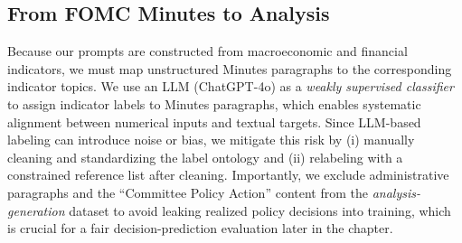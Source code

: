 








\subsection*{From FOMC Minutes to Analysis}

Because our prompts are constructed from macroeconomic and financial indicators, we must map unstructured Minutes paragraphs to the corresponding indicator topics. We use an LLM (ChatGPT-4o) as a \textit{weakly supervised classifier} to assign indicator labels to Minutes paragraphs, which enables systematic alignment between numerical inputs and textual targets. Since LLM-based labeling can introduce noise or bias, we mitigate this risk by (i) manually cleaning and standardizing the label ontology and (ii) relabeling with a constrained reference list after cleaning. Importantly, we exclude administrative paragraphs and the ``Committee Policy Action'' content from the \textit{analysis-generation} dataset to avoid leaking realized policy decisions into training, which is crucial for a fair decision-prediction evaluation later in the chapter.



